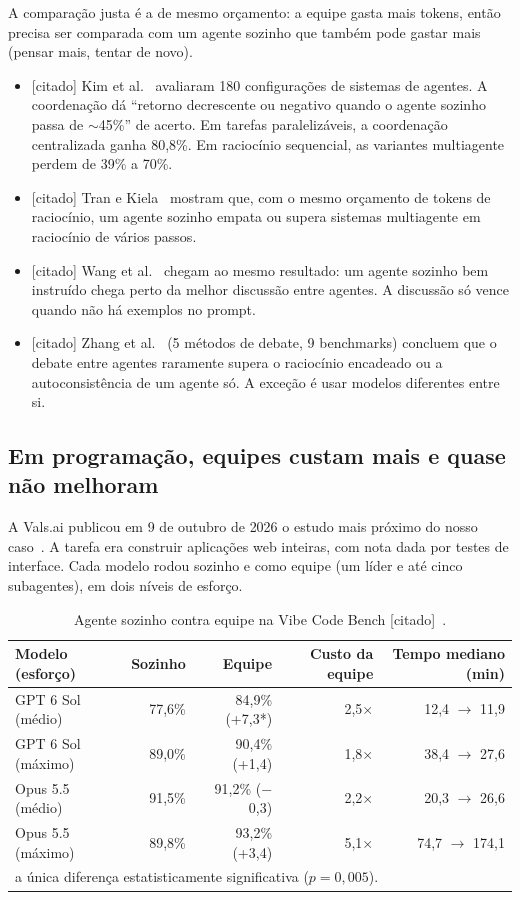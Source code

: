 \documentclass[11pt,a4paper]{article}
\newcommand{\rot}[1]{\textsf{\footnotesize[#1]}}
\begin{document}
A comparação justa é a de mesmo orçamento: a equipe gasta mais tokens, então precisa ser comparada
com um agente sozinho que também pode gastar mais (pensar mais, tentar de novo).

\begin{itemize}
  \item \rot{citado} Kim et al.~\cite{kim2025} avaliaram 180 configurações de sistemas de agentes.
    A coordenação dá ``retorno decrescente ou negativo quando o agente sozinho passa de ${\sim}$45\%''
    de acerto. Em tarefas paralelizáveis, a coordenação centralizada ganha 80,8\%. Em raciocínio
    sequencial, as variantes multiagente perdem de 39\% a 70\%.
  \item \rot{citado} Tran e Kiela~\cite{tran2026} mostram que, com o mesmo orçamento de tokens de
    raciocínio, um agente sozinho empata ou supera sistemas multiagente em raciocínio de vários passos.
  \item \rot{citado} Wang et al.~\cite{rethinking2024} chegam ao mesmo resultado: um agente sozinho
    bem instruído chega perto da melhor discussão entre agentes. A discussão só vence quando não há
    exemplos no prompt.
  \item \rot{citado} Zhang et al.~\cite{mad2025} (5 métodos de debate, 9 benchmarks) concluem que o debate entre agentes raramente supera
    o raciocínio encadeado ou a autoconsistência de um agente só. A exceção é usar modelos diferentes
    entre si.
\end{itemize}

\subsection{Em programação, equipes custam mais e quase não melhoram}

A Vals.ai publicou em 9 de outubro de 2026 o estudo mais próximo do nosso caso~\cite{vals2026}.
A tarefa era construir aplicações web inteiras, com nota dada por testes de interface. Cada modelo
rodou sozinho e como equipe (um líder e até cinco subagentes), em dois níveis de esforço.

\begin{table}[H]
\centering\small
\caption{Agente sozinho contra equipe na Vibe Code Bench \rot{citado}~\cite{vals2026}.}
\begin{tabular}{lrrrr}
\toprule
Modelo (esforço) & Sozinho & Equipe & Custo da equipe & Tempo mediano (min) \\
\midrule
GPT 6 Sol (médio)   & 77,6\% & 84,9\% (+7,3*) & 2,5$\times$ & 12,4 $\to$ 11,9 \\
GPT 6 Sol (máximo)  & 89,0\% & 90,4\% (+1,4)  & 1,8$\times$ & 38,4 $\to$ 27,6 \\
Opus 5.5 (médio)    & 91,5\% & 91,2\% ($-$0,3) & 2,2$\times$ & 20,3 $\to$ 26,6 \\
Opus 5.5 (máximo)   & 89,8\% & 93,2\% (+3,4)  & 5,1$\times$ & 74,7 $\to$ 174,1 \\
\bottomrule
\multicolumn{5}{l}{\footnotesize * a única diferença estatisticamente significativa ($p = 0{,}005$).}
\end{tabular}
\end{table}
\end{document}
